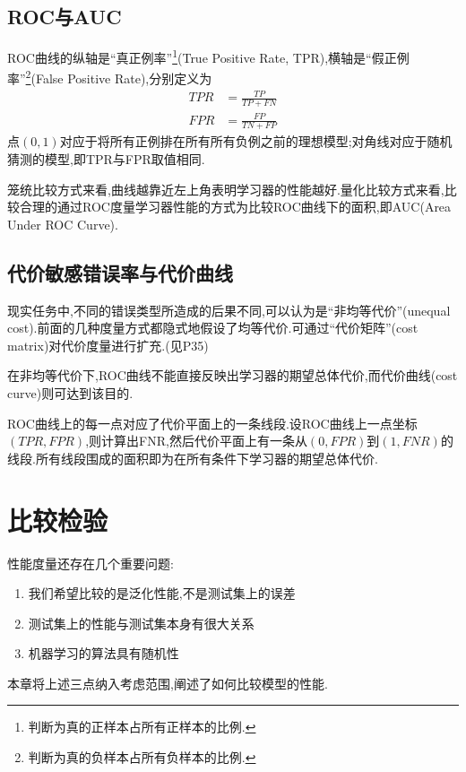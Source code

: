 \subsection{ROC与AUC}

ROC曲线的纵轴是``真正例率''\footnote{判断为真的正样本占所有正样本的比例.}(True Positive Rate, TPR),横轴是``假正例率''\footnote{判断为真的负样本占所有负样本的比例.}(False Positive Rate),分别定义为
\begin{equation}\begin{split}
TPR&=\frac{TP}{TP+FN}\\
FPR&=\frac{FP}{TN+FP}
\end{split}\end{equation}
点$(0,1)$对应于将所有正例排在所有所有负例之前的理想模型;对角线对应于随机猜测的模型,即TPR与FPR取值相同.

笼统比较方式来看,曲线越靠近左上角表明学习器的性能越好.量化比较方式来看,比较合理的通过ROC度量学习器性能的方式为比较ROC曲线下的面积,即AUC(Area Under ROC Curve).

\subsection{代价敏感错误率与代价曲线}

现实任务中,不同的错误类型所造成的后果不同,可以认为是``非均等代价''(unequal cost).前面的几种度量方式都隐式地假设了均等代价.可通过``代价矩阵''(cost matrix)对代价度量进行扩充.(见P35)

在非均等代价下,ROC曲线不能直接反映出学习器的期望总体代价,而代价曲线(cost curve)则可达到该目的.

ROC曲线上的每一点对应了代价平面上的一条线段.设ROC曲线上一点坐标$(TPR,FPR)$,则计算出FNR,然后代价平面上有一条从$(0,FPR)$到$(1,FNR)$的线段.所有线段围成的面积即为在所有条件下学习器的期望总体代价.

\section{比较检验}

性能度量还存在几个重要问题:
\begin{enumerate}
\item 我们希望比较的是泛化性能,不是测试集上的误差
\item 测试集上的性能与测试集本身有很大关系
\item 机器学习的算法具有随机性
\end{enumerate}
本章将上述三点纳入考虑范围,阐述了如何比较模型的性能.


